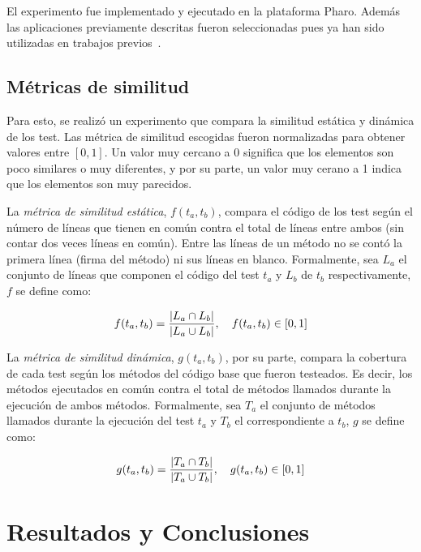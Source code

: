 \par El experimento fue implementado y ejecutado en la plataforma Pharo. Además las aplicaciones previamente descritas fueron seleccionadas pues ya han sido utilizadas en trabajos previos~\cite{Berg11d}.

\subsection{Métricas de similitud}
\par Para esto, se realizó un experimento que compara la similitud estática y dinámica de los test. Las métrica de similitud escogidas fueron normalizadas para obtener valores entre $\left[ 0 , 1 \right]$. Un valor muy cercano a $0$ significa que los elementos son poco similares o muy diferentes, y por su parte, un valor muy cerano a 1 indica que los elementos son muy parecidos. 

\par La \emph{métrica de similitud estática}, $f(t_a,t_b)$, compara el código de los test según el número de líneas que tienen en común contra el total de líneas entre ambos (sin contar dos veces líneas en común). Entre las líneas de un método no se contó la primera línea (firma del método) ni sus líneas en blanco. Formalmente, sea $L_{a}$ el conjunto de líneas que componen el código del test $t_a$ y  $L_{b}$ de $t_b$ respectivamente, $f$ se define como: 

\[ f(t_a,t_b)= \dfrac{\vert L_{a} \cap L_{b} \vert}{\vert L_{a} \cup L_{b} \vert} , \quad f(t_a,t_b) \in \left[ 0 , 1 \right] \]

\par La \emph{métrica de similitud dinámica}, $g(t_a,t_b)$, por su parte, compara la cobertura de cada test según los métodos del código base que fueron testeados. Es decir, los métodos ejecutados en común contra el total de métodos llamados durante la ejecución de ambos métodos. Formalmente, sea $T_{a}$ el conjunto de métodos llamados durante la ejecución del test $t_a$ y $T_{b}$ el correspondiente a $t_b$, $g$ se define como: 

\[ g(t_a,t_b)= \dfrac{\vert T_{a} \cap T_{b} \vert}{\vert T_{a} \cup T_{b} \vert} , \quad g(t_a,t_b) \in \left[ 0 , 1 \right] \]


\section{Resultados y Conclusiones}

